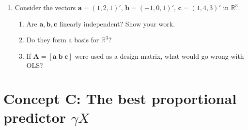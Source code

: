 \documentclass{article}
\begin{document}
\begin{enumerate}[label=\textbf{B.\arabic*},leftmargin=*,itemsep=10pt]
\item Consider the vectors $\bm{a} = (1, 2, 1)'$, $\bm{b} = (-1, 0, 1)'$, $\bm{c} = (1, 4, 3)'$ in $\mathbb{R}^3$.
\begin{enumerate}[label=(\alph*)]
  \item Are $\bm{a}, \bm{b}, \bm{c}$ linearly independent?  Show your work.
  \item Do they form a basis for $\mathbb{R}^3$?
  \item If $\bm{A} = [\bm{a} \; \bm{b} \; \bm{c}]$ were used as a design matrix, what would go wrong with OLS?
\end{enumerate}

\end{enumerate}

\bigskip

\section*{Concept C: The best proportional predictor $\gamma X$}
\end{document}
